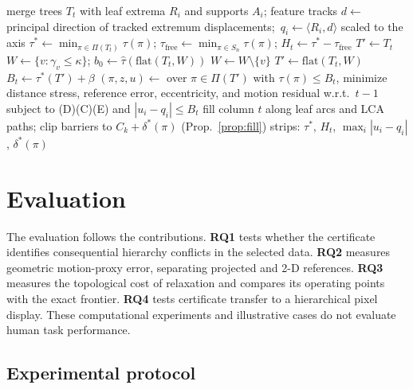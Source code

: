 \documentclass[review]{vgtc}                 %
\newcommand{\free}{\mathrm{free}}
\begin{document}
\begin{algorithm}[t]
\caption{Certificate-driven merge tree map. Constants: $\theta=2\%$ of the axis; canvas-relative $g,\beta,\rho$; budget $\kappa$.}\label{alg:pipeline}
\begin{algorithmic}[1]
\Require merge trees $T_t$ with leaf extrema $R_i$ and supports $A_i$; feature tracks
\State $d\gets$ principal direction of tracked extremum displacements;\ $q_i\gets\langle R_i,d\rangle$ scaled to the axis
  \State $\tau^*\gets\min_{\pi\in\Pi(T_t)}\tau(\pi)$; $\tau_\free\gets\min_{\pi\in S_n}\tau(\pi)$; $H_t\gets\tau^*-\tau_\free$
  \State $T'\gets T_t$
   
    \State $W\gets\{v:\gamma_v\le\kappa\}$; $b_0\gets\widehat\tau(\mathrm{flat}(T_t,W))$
        \State $W\gets W\setminus\{v\}$
      \EndIf
    \EndFor
    \State $T'\gets\mathrm{flat}(T_t,W)$
  \EndIf
  \State $B_t\gets\tau^*(T')+\beta$ 
  \State $(\pi,z,u)\gets$ over $\pi\in\Pi(T')$ with $\tau(\pi)\le B_t$, minimize distance stress, reference error, eccentricity, and motion residual w.r.t.\ $t-1$ subject to (D)(C)(E) and $|u_i-q_i|\le B_t$ 
  \State fill column $t$ along leaf arcs and LCA paths; clip barriers to $C_k+\delta^*(\pi)$ (Prop.~\ref{prop:fill})
  \State strips: $\tau^*$, $H_t$, $\max_i|u_i-q_i|$, $\delta^*(\pi)$
\EndFor
\end{algorithmic}
\end{algorithm}

\section{Evaluation}\label{sec:eval}

The evaluation follows the contributions. \textbf{RQ1} tests whether the certificate identifies consequential hierarchy conflicts in the selected data. \textbf{RQ2} measures geometric motion-proxy error, separating projected and 2-D references. \textbf{RQ3} measures the topological cost of relaxation and compares its operating points with the exact frontier. \textbf{RQ4} tests certificate transfer to a hierarchical pixel display. These computational experiments and illustrative cases do not evaluate human task performance.

\subsection{Experimental protocol}
\end{document}
